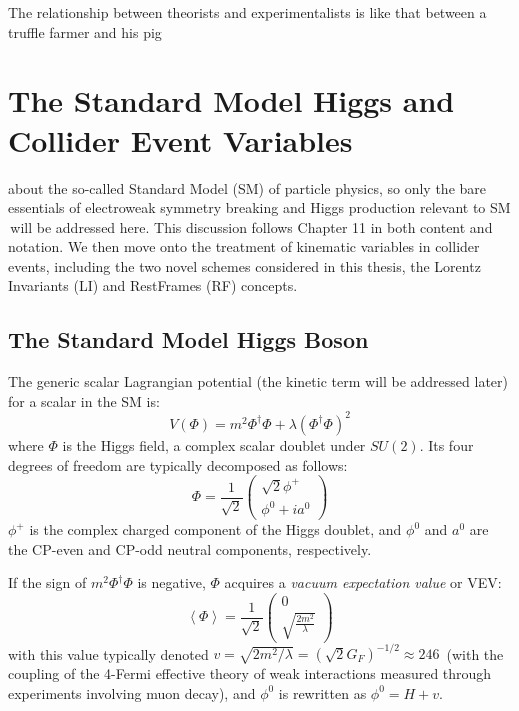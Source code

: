 \begin{savequote}[75mm]
The relationship between theorists and experimentalists is like that between a truffle farmer and his pig%
\end{savequote}

\chapter{The Standard Model Higgs and Collider Event Variables}
\label{ch:theory}

 about the so-called Standard Model (SM) of particle physics, so only the bare essentials of electroweak symmetry breaking and Higgs production relevant to SM \vhbb\,will be addressed here.  This discussion follows \cite{pdg} Chapter 11 in both content and notation.  We then move onto the treatment of kinematic variables in collider events, including the two novel schemes considered in this thesis, the Lorentz Invariants (LI) and RestFrames (RF) concepts.

\section{The Standard Model Higgs Boson}
The generic scalar Lagrangian potential (the kinetic term will be addressed later) for a scalar in the SM is:
\begin{equation}
V\left(\Phi\right) = m^2\Phi^\dagger\Phi+\lambda\left(\Phi^\dagger\Phi\right)^2
\end{equation}
where $\Phi$ is the Higgs field, a complex scalar doublet under $SU\left(2\right)$.  Its four degrees of freedom are typically decomposed as follows:
\begin{equation}
\Phi = \frac{1}{\sqrt{2}} \left(\begin{array}{c} \sqrt{2}\phi^+\\ \phi^0 + ia^0 \end{array}\right)
\end{equation}
$\phi^+$ is the complex charged component of the Higgs doublet, and $\phi^0$ and $a^0$ are the CP-even and CP-odd neutral components, respectively.

If the sign of $m^2\Phi^\dagger\Phi$ is negative, $\Phi$ acquires a \emph{vacuum expectation value} or VEV:
\begin{equation}
\left<\Phi\right> = \frac{1}{\sqrt{2}} \left(\begin{array}{c} 0 \\ \sqrt{\frac{2m^2}{\lambda}} \end{array}\right)
\end{equation}
with this value typically denoted $v=\sqrt{2m^2/\lambda}=\left(\sqrt{2}G_F\right)^{-1/2}\approx246$ \GeV\,(with the coupling of the 4-Fermi effective theory of weak interactions measured through experiments involving muon decay), and $\phi^0$ is rewritten as $\phi^0=H+v$.

